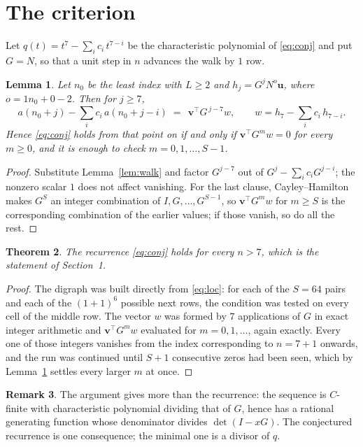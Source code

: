 \documentclass[11pt,a4paper]{article}
\theoremstyle{plain}
\newtheorem{theorem}{Theorem}
\newtheorem{lemma}[theorem]{Lemma}
\theoremstyle{definition}
\newtheorem{remark}[theorem]{Remark}
\begin{document}
\section{The criterion}

Let $q(t)=t^{7}-\sum_i c_i\,t^{7-i}$ be the characteristic polynomial of
\eqref{eq:conj} and put $G=N$, so that a unit step in $n$ advances the walk by
$1$ row.

\begin{lemma}\label{lem:crit}
Let $n_0$ be the least index with $L\ge2$ and $h_j=G^{j}N^{o}\mathbf{u}$, where
$o=1n_0+0-2$. Then for $j\ge7$,
\[
a(n_0+j)-\sum_i c_i\,a(n_0+j-i)\;=\;\,\mathbf{v}^{\!\top}G^{\,j-7}w,
\qquad w=h_{7}-\sum_i c_i\,h_{7-i} .
\]
Hence \eqref{eq:conj} holds from that point on if and only if
$\mathbf{v}^{\!\top}G^{m}w=0$ for every $m\ge0$, and it is enough to check
$m=0,1,\dots,S-1$.
\end{lemma}

\begin{proof}
Substitute Lemma~\ref{lem:walk} and factor $G^{j-7}$ out of
$G^{j}-\sum_ic_iG^{j-i}$; the nonzero scalar $1$ does not affect
vanishing. For the last clause, Cayley--Hamilton makes $G^{S}$ an integer combination of
$I,G,\dots,G^{S-1}$, so $\mathbf{v}^{\!\top}G^{m}w$ for $m\ge S$ is the corresponding
combination of the earlier values; if those vanish, so do all the rest.
\end{proof}

\begin{theorem}
The recurrence \eqref{eq:conj} holds for every $n>7$, which is the statement of
Section~1.
\end{theorem}

\begin{proof}
The digraph was built directly from \eqref{eq:loc}: for each of the $S=64$ pairs and each
of the $(1+1)^{6}$ possible next rows, the condition was tested on every cell of
the middle row. The vector $w$ was formed by $7$ applications of $G$ in exact integer
arithmetic and $\mathbf{v}^{\!\top}G^{m}w$ evaluated for $m=0,1,\dots$, again exactly.
Every one of those integers vanishes from the index corresponding to $n=7+1$ onwards,
and the run was continued until $S+1$ consecutive zeros had been seen, which by
Lemma~\ref{lem:crit} settles every larger $m$ at once.
\end{proof}

\begin{remark}
The argument gives more than the recurrence: the sequence is $C$-finite with characteristic
polynomial dividing that of $G$, hence has a rational generating function whose denominator
divides $\det(I-xG)$. The conjectured recurrence is one consequence; the minimal one is a
divisor of $q$.
\end{remark}
\end{document}
